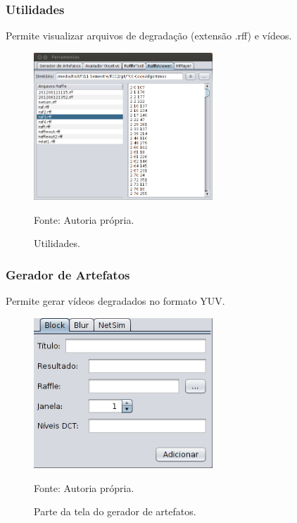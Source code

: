         \begin{frame}\frametitle{Utilidades}
            Permite visualizar arquivos de degradação (extensão .rff) e vídeos.
		    \begin{figure}
			    \includegraphics[width=0.6\textwidth]{./imgs/ferramentas-viewer.png}
			    \caption{Utilidades.}
			    \tiny
			    Fonte: Autoria própria.
		    \end{figure}
        \end{frame}
        
        \begin{frame}\frametitle{Gerador de Artefatos}
            Permite gerar vídeos degradados no formato YUV.
		    \begin{figure}
			    \includegraphics[width=0.6\textwidth]{./imgs/ferramentas-gerador.png}
			    \caption{Parte da tela do gerador de artefatos.}
			    \tiny
			    Fonte: Autoria própria.
		    \end{figure}
        \end{frame}
        
